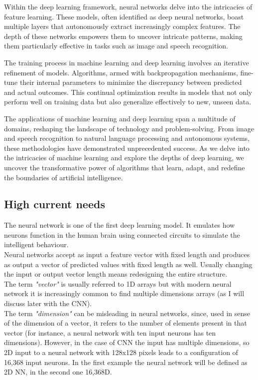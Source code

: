 Within the deep learning framework, neural networks delve into the intricacies of feature learning. These models, often identified as deep neural networks, boast multiple layers that autonomously extract increasingly complex features. The depth of these networks empowers them to uncover intricate patterns, making them particularly effective in tasks such as image and speech recognition.

The training process in machine learning and deep learning involves an iterative refinement of models. Algorithms, armed with backpropagation mechanisms, fine-tune their internal parameters to minimize the discrepancy between predicted and actual outcomes. This continual optimization results in models that not only perform well on training data but also generalize effectively to new, unseen data.

The applications of machine learning and deep learning span a multitude of domains, reshaping the landscape of technology and problem-solving. From image and speech recognition to natural language processing and autonomous systems, these methodologies have demonstrated unprecedented success. As we delve into the intricacies of machine learning and explore the depths of deep learning, we uncover the transformative power of algorithms that learn, adapt, and redefine the boundaries of artificial intelligence.
\subsection{High current needs}
The neural network is one of the first deep learning model. It emulates how neurons function in the human brain using connected circuits to simulate the intelligent behaviour.\\
Neural networks accept as input a feature vector with fixed length and produces as output a vector of predicted values with fixed length as well. Usually changing the input or output vector length means redesigning the entire structure.\\
The term \textit{"vector"} is usually referred to 1D arrays but with modern neural network it is increasingly common to find multiple dimensions arrays (as I will discuss later with the CNN).\\
The term \textit{"dimension"} can be misleading in neural networks, since, used in sense of the dimension of a vector, it refers to the number of elements present in that vector (for instance, a neural network with ten input neurons has ten dimensions). However, in the case of CNN the input has multiple dimensions, so 2D input to a neural network with 128x128 pixels leads to a configuration of 16,368 input neurons. In the first example the neural network will be defined as 2D NN, in the second one 16,368D.

